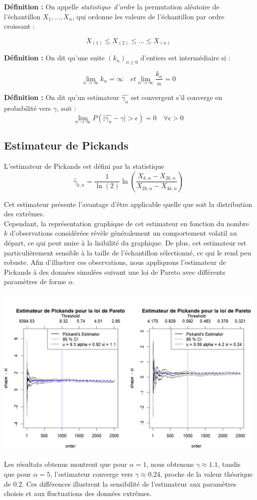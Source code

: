 \documentclass{article}
\begin{document}
\textbf{Définition :} On appelle \textit{statistique d'ordre} la permutation aléatoire de l'échantillon \(X_1, \dots, X_n\), qui ordonne les valeurs de l’échantillon par ordre croissant :

\[
X_{(1)} \leq X_{(2)} \leq \dots \leq X_{(n)}
\]

\textbf{Définition :} On dit qu'une suite \((k_n)_{n \geq 0}\) d'entiers est intermédiaire si :

\[
\lim_{n \to \infty} k_n = \infty \quad et \lim_{n \to \infty} \frac{k_n}{n} = 0
\]

\textbf{Définition :}
On dit qu'un estimateur \(\hat{\gamma_{n}}\) est convergent s'il converge en probabilité vers \(\gamma\), soit :
\[
\lim_{n \to \infty} P(\lvert \hat{\gamma_{n}} - \gamma \rvert > \epsilon) = 0 \quad \forall \epsilon > 0
\]
\subsection{Estimateur de Pickands}

L'estimateur de Pickands est défini par la statistique 
\[
\hat{\gamma}_{k,n} = \frac{1}{\ln(2)} \ln\left(\frac{X_{k,n} - X_{2k,n}}{X_{2k,n} - X_{4k,n}}\right)
\]

Cet estimateur présente l'avantage d'être applicable quelle que soit la distribution des extrêmes. \\

Cependant, la représentation graphique de cet estimateur en fonction du nombre \(k\) d'observations considérées révèle généralement un comportement volatil au départ, ce qui peut nuire à la lisibilité du graphique. De plus, cet estimateur est particulièrement sensible à la taille de l'échantillon sélectionné, ce qui le rend peu robuste.
Afin d'illustrer ces observations, nous appliquons l'estimateur de Pickands à des données simulées suivant une loi de Pareto avec différents paramètres de forme \(\alpha\).
\begin{center}
	\includegraphics[scale=0.6]{./Codes_R/estimateur_pickands_pareto.png} 
\end{center}
Les résultats obtenus montrent que pour \( \alpha = 1\), nous obtenons \(\gamma \approx 1.1\), tandis que pour \(\alpha = 5\), l'estimateur converge vers \(\gamma \approx 0.24\), proche de la valeur théorique de \(0.2\). Ces différences illustrent la sensibilité de l'estimateur aux paramètres choisis et aux fluctuations des données extrêmes.  \\
\end{document}
